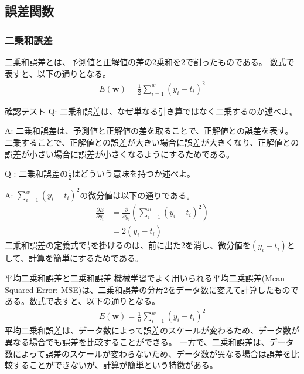 \documentclass{ltjsarticle}
\begin{document}
\subsection{誤差関数}
\subsubsection{二乗和誤差}
二乗和誤差とは、予測値と正解値の差の2乗和を2で割ったものである。
数式で表すと、以下の通りとなる。
\begin{align}
  E(\mathbf{w}) = \frac{1}{2}\sum_{i=1}^{w}(y_i - t_i)^2
\end{align}

\begin{itembox}[l]{確認テスト}
  Q: 二乗和誤差は、なぜ単なる引き算ではなく二乗するのか述べよ。
  
  A: 二乗和誤差は、予測値と正解値の差を取ることで、正解値との誤差を表す。二乗することで、正解値との誤差が大きい場合に誤差が大きくなり、正解値との誤差が小さい場合に誤差が小さくなるようにするためである。

  Q : 二乗和誤差の$\frac{1}{2}$はどういう意味を持つか述べよ。

  A: $\sum_{i=1}^{w} (y_i-t_i)^2$の微分値は以下の通りである。
  \begin{align}
    \frac{\partial E}{\partial y_i} &= \frac{\partial}{\partial y_i}\left( \sum_{i=1}^{n}(y_i - t_i)^2 \right) \\
    &= 2(y_i - t_i)
  \end{align}
  二乗和誤差の定義式で$\frac{1}{2}$を掛けるのは、前に出た2を消し、微分値を$(y_i - t_i)$として、計算を簡単にするためである。
\end{itembox}

\begin{itembox}{平均二乗和誤差と二乗和誤差}
機械学習でよく用いられる平均二乗誤差(Mean Squared Error: MSE)は、二乗和誤差の分母2をデータ数に変えて計算したものである。数式で表すと、以下の通りとなる。
\begin{align}
  E(\mathbf{w}) = \frac{1}{n}\sum_{i=1}^{w}(y_i - t_i)^2
\end{align}
平均二乗和誤差は、データ数によって誤差のスケールが変わるため、データ数が異なる場合でも誤差を比較することができる。
一方で、二乗和誤差は、データ数によって誤差のスケールが変わらないため、データ数が異なる場合は誤差を比較することができないが、計算が簡単という特徴がある。
\end{itembox}
\end{document}

